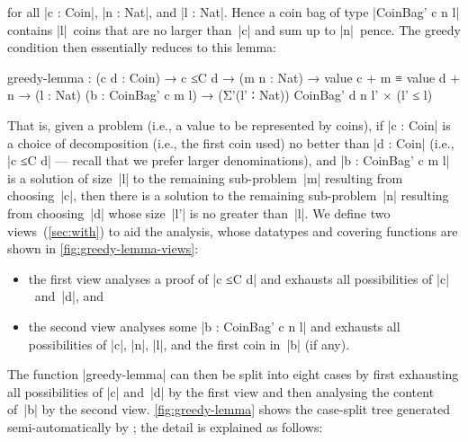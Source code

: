 for all |c : Coin|, |n : Nat|, and |l : Nat|.
Hence a coin bag of type |CoinBag' c n l| contains |l|~coins that are no larger than~|c| and sum up to |n|~pence.
The greedy condition then essentially reduces to this lemma:
\begin{code}
greedy-lemma :  (c d : Coin) → c ≤C d →
                (m n : Nat) → value c + m ≡ value d + n →
                (l : Nat) (b : CoinBag' c m l) →
                (Σ'(l' ∶ Nat)) CoinBag' d n l' × (l' ≤ l)
\end{code}
That is, given a problem (i.e., a value to be represented by coins), if |c : Coin| is a choice of decomposition (i.e., the first coin used) no better than |d : Coin| (i.e., |c ≤C d| --- recall that we prefer larger denominations), and |b : CoinBag' c m l| is a solution of size~|l| to the remaining sub-problem~|m| resulting from choosing~|c|, then there is a solution to the remaining sub-problem~|n| resulting from choosing~|d| whose size~|l'| is no greater than~|l|.
We define two views~(\autoref{sec:with}) to aid the analysis, whose datatypes and covering functions are shown in \autoref{fig:greedy-lemma-views}:
\begin{itemize}
\item the first view analyses a proof of |c ≤C d| and exhausts all possibilities of |c|~and~|d|, and
\item the second view analyses some |b : CoinBag' c n l| and exhausts all possibilities of |c|, |n|, |l|, and the first coin in~|b| (if any).
\end{itemize}
The function |greedy-lemma| can then be split into eight cases by first exhausting all possibilities of |c| and~|d| by the first view and then analysing the content of~|b| by the second view.
\autoref{fig:greedy-lemma} shows the case-split tree generated semi-automatically by \Agda; the detail is explained as follows:
